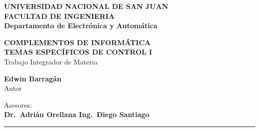\documentclass[12pt,a4paper,twosides,openright]{report}
\begin{document}
		\renewcommand{\tablename}{Tabla}

		\begin{titlepage}
			\begin{center}
				\begin{Large}
					\textbf{UNIVERSIDAD NACIONAL DE SAN JUAN\\
					\vspace*{0.05in}
					FACULTAD DE INGENIERIA\\
					\vspace*{0.05in}
					Departamento de Electrónica y Automática\\
					\vspace*{\fill}}
				\end{Large}
				\begin{Large}
					\textbf{COMPLEMENTOS DE INFORMÁTICA\\TEMAS ESPECÍFICOS DE CONTROL I} \\
					Trabajo Integrador de Materia\\
				\end{Large}
				\vspace*{\fill}
				\begin{large}
					\textbf{Edwin Barragán}\\
					Autor\\
				\end{large}
				\vspace*{0.5in}
				\begin{large}
					Asesores: \\
					\textbf{Dr.~Adrián Orellana \hspace*{3pt}
					Ing.~Diego Santiago\\}
				\end{large}
				\vspace{\fill}
				\rule{80mm}{0.1mm}\\
				\vspace{.1in}
				\the\year
			\end{center}

		\end{titlepage}

		

		\tableofcontents

		
\end{document}
